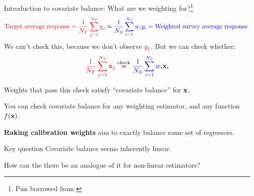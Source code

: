 

\begin{frame}[t]{Introduction to covariate balance: What are we weighting for?\footnote{Pun borrowed from \textcite{solon:2015:weightingfor}}}
$$
\textcolor{red}{\textrm{Target average response} =
\frac{1}{{\textcolor{red}{N_T}}} \sum_{j=1}^{\textcolor{red}{N_T}} y_j} \approx \textcolor{blue}{\frac{1}{{\textcolor{blue}{N_S}}} \sum_{i=1}^{\textcolor{blue}{N_S}} w_i y_i
= \textrm{Weighted survey average response }}
$$
We can't check this, because we don't observe $\textcolor{red}{y_j}$.  \pause But we can check whether:
$$
    \textcolor{red}{\frac{1}{{\textcolor{red}{N_T}}} \sum_{j=1}^{\textcolor{red}{N_T}} \mathbf{x}_j} \overset{\textrm{check}}{=} \textcolor{blue}{\frac{1}{{\textcolor{blue}{N_S}}} \sum_{i=1}^{\textcolor{blue}{N_S}} w_i \mathbf{x}_i}
$$

Weights that pass this check satisfy ``covariate balance'' for $\mathbf{x}$.

\pause

\vspace{1em}

You can check covariate balance for any weighting estimator,
and any function $f(\mathbf{x})$.

\textbf{Raking calibration weights} aim to exactly balance some set of regressors.


\pause

\begin{block}{Key question}
%
Covariate balance seems inherently linear. 

How can the there be an analogue of it for non-linear estimators?
%
\end{block}


\end{frame}





